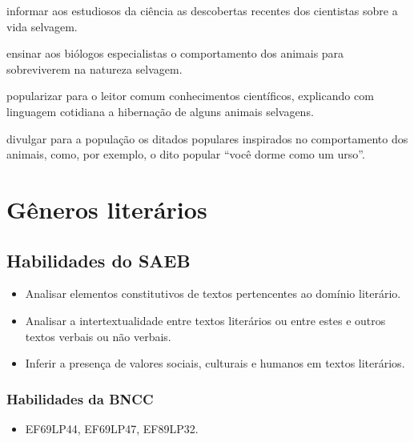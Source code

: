 \begin{escolha}

\item informar aos estudiosos da ciência as descobertas recentes dos
cientistas sobre a vida selvagem.

\item ensinar aos biólogos especialistas o comportamento dos animais para
sobreviverem na natureza selvagem.

\item popularizar para o leitor comum conhecimentos científicos, explicando
com linguagem cotidiana a hibernação de alguns animais selvagens.

\item divulgar para a população os ditados populares inspirados no
comportamento dos animais, como, por exemplo, o dito popular ``você
dorme como um urso''.
\end{escolha}

\chapter{Gêneros literários}

\section{Habilidades do SAEB} 

\begin{itemize}
  \item
Analisar elementos constitutivos de
textos pertencentes ao domínio literário.
\item Analisar a intertextualidade
entre textos literários ou entre estes e outros textos verbais ou não
verbais.
\item Inferir a presença de valores sociais, culturais e humanos em
textos literários.
\end{itemize}

\subsection{Habilidades da BNCC}

\begin{itemize}
\tightlist
\item
  EF69LP44, EF69LP47, EF89LP32.
\end{itemize}


